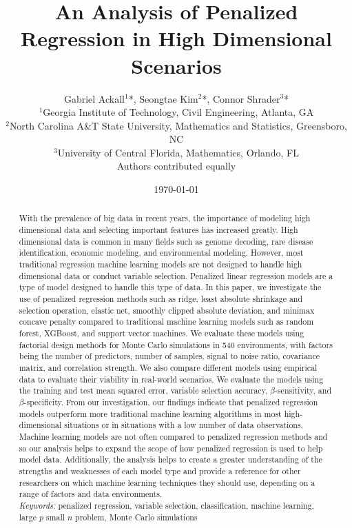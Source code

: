 \documentclass{article}
\title{An Analysis of Penalized Regression in High Dimensional Scenarios}
\author{Gabriel Ackall$^1$*, Seongtae Kim$^2$*, Connor Shrader$^3$* \\
	{\footnotesize $^1$Georgia Institute of Technology, Civil Engineering, Atlanta, GA} \\
	{\footnotesize $^2$North Carolina A\&T State University, Mathematics and Statistics, Greensboro, NC} \\
	{\footnotesize $^3$University of Central  Florida, Mathematics, Orlando, FL} \\
	{\footnotesize *Authors contributed equally}}
\date{\today}
\begin{document}
	\maketitle
	\begin{abstract}
		With the prevalence of big data in recent years, the importance of modeling high dimensional data and selecting important features has increased greatly. High dimensional data is common in many fields such as genome decoding, rare disease identification, economic modeling, and environmental modeling. However, most traditional regression machine learning models are not designed to handle high dimensional data or conduct variable selection. Penalized linear regression models are a type of model designed to handle this type of data. In this paper, we investigate the use of penalized regression methods such as ridge, least absolute shrinkage and selection operation, elastic net, smoothly clipped absolute deviation, and minimax concave penalty compared to traditional machine learning models such as random forest, XGBoost, and support vector machines. We evaluate these models using factorial design methods for Monte Carlo simulations in 540 environments, with factors being the number of predictors, number of samples, signal to noise ratio, covariance matrix, and correlation strength. We also compare different models using empirical data to evaluate their viability in real-world scenarios. We evaluate the models using the training and test mean squared error, variable selection accuracy, $\beta$-sensitivity, and $\beta$-specificity. From our investigation, our findings indicate that penalized regression models outperform more traditional machine learning algorithms in most high-dimensional situations or in situations with a low number of data observations. Machine learning models are not often compared to penalized regression methods and so our analysis helps to expand the scope of how penalized regression is used to help model data. Additionally, the analysis helps to create a greater understanding of the strengths and weaknesses of each model type and provide a reference for other researchers on which machine learning techniques they should use, depending on a range of factors and data environments. \\
		
		\textit{Keywords:} penalized regression, variable selection, classification, machine learning, large $p$ small $n$ problem, Monte Carlo simulations
	\end{abstract}
	
	\newpage
	
\end{document}
